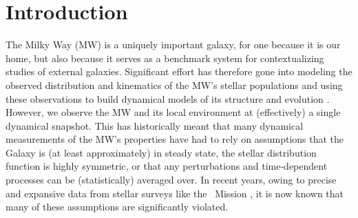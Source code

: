 \section{Introduction} \label{sec:intro}

The Milky Way (MW) is a uniquely important galaxy, for one because it is our home, but
also because it serves as a benchmark system for contextualizing studies of external
galaxies.
Significant effort has therefore gone into modeling the observed distribution and
kinematics of the MW's stellar populations \citep[for a review,][]{Bland-Hawthron:2016}
and using these observations to build dynamical models of its structure and evolution
\citep[e.g.,][]{Binney:2008, CITE, MANY}.
However, we observe the MW and its local environment at (effectively) a single dynamical
snapshot.
This has historically meant that many dynamical measurements of the MW's properties have
had to rely on assumptions that the Galaxy is (at least approximately) in steady state,
the stellar distribution function is highly symmetric, or that any perturbations and
time-dependent processes can be (statistically) averaged over.
In recent years, owing to precise and expansive data from stellar surveys like the
\gaia\ Mission \citep{Gaia-overview}, it is now known that many of these assumptions
are significantly violated.


